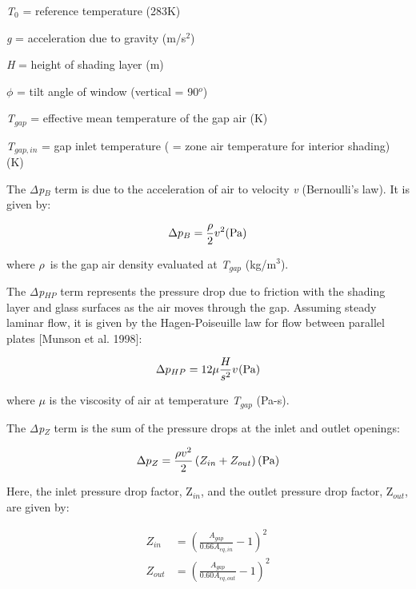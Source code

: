 \emph{T\(_{0}\)} = reference temperature (283K)

\emph{g} = acceleration due to gravity (m/s\(^{2}\))

\emph{H} = height of shading layer (m)

\emph{$\phi$} = tilt angle of window (vertical = 90\(^{o}\))

\emph{T\(_{gap}\)} = effective mean temperature of the gap air (K)

\emph{T\(_{gap,in}\)} = gap inlet temperature ( = zone air temperature for interior shading) (K)

The \emph{Δp\(_{B}\)} term is due to the acceleration of air to velocity \emph{v} (Bernoulli's law). It is given by:

\begin{equation}
\Delta {p_B} = \frac{\rho }{2}{v^2}{\rm{    (Pa)}}
\end{equation}

where \emph{$\rho$}~is the gap air density evaluated at \emph{T\(_{gap}\)} (kg/m\(^{3}\)).

The \emph{Δp\(_{HP}\)} term represents the pressure drop due to friction with the shading layer and glass surfaces as the air moves through the gap. Assuming steady laminar flow, it is given by the Hagen-Poiseuille law for flow between parallel plates {[}Munson et al. 1998{]}:

\begin{equation}
\Delta {p_{HP}} = 12\mu \frac{H}{{{s^2}}}{v^{}}{\rm{    (Pa)}}
\end{equation}

where \emph{$\mu$} is the viscosity of air at temperature \emph{T\(_{gap}\)} (Pa-s).

The \emph{Δp\(_{Z}\)} term is the sum of the pressure drops at the inlet and outlet openings:

\begin{equation}
\Delta {p_Z} = \frac{{\rho {v^2}}}{2}\left( {{Z_{in}} + {Z_{out}}} \right){\rm{    (Pa)}}
\end{equation}

Here, the inlet pressure drop factor, Z\(_{in}\), and the outlet pressure drop factor, Z\(_{out}\), are given by:

\begin{equation}
  \begin{array}{rl}
    Z_{in}  & = \left( \frac{A_{gap}}{0.66A_{eq,in}}  - 1 \right)^2 \\
    Z_{out} & = \left( \frac{A_{gap}}{0.60A_{eq,out}} - 1 \right)^2
  \end{array}
\end{equation}

